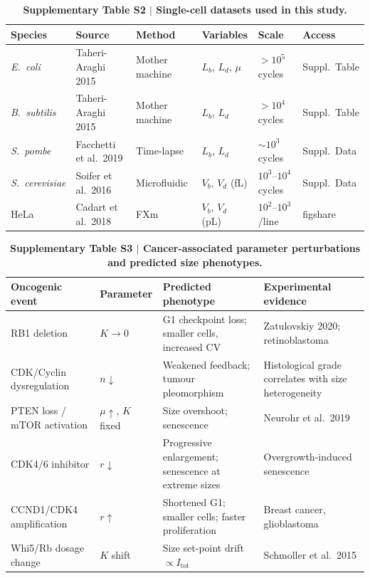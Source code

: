 \documentclass[11pt]{article}
\begin{document}
\begin{table}[H]
\centering
\caption{\textbf{Supplementary Table S2 $|$ Single-cell datasets used
in this study.}}
\small
\begin{tabular}{llllll}
\toprule
\textbf{Species} & \textbf{Source} & \textbf{Method} & \textbf{Variables}
  & \textbf{Scale} & \textbf{Access} \\
\midrule
\textit{E.~coli}
  & Taheri-Araghi 2015
  & Mother machine
  & $L_b$, $L_d$, $\mu$
  & $>10^5$ cycles
  & Suppl.\ Table \\
\textit{B.~subtilis}
  & Taheri-Araghi 2015
  & Mother machine
  & $L_b$, $L_d$
  & $>10^4$ cycles
  & Suppl.\ Table \\
\textit{S.~pombe}
  & Facchetti et al.\ 2019
  & Time-lapse
  & $L_b$, $L_d$
  & $\sim10^3$ cycles
  & Suppl.\ Data \\
\textit{S.~cerevisiae}
  & Soifer et al.\ 2016
  & Microfluidic
  & $V_b$, $V_d$ (fL)
  & $10^3$--$10^4$ cycles
  & Suppl.\ Data \\
HeLa
  & Cadart et al.\ 2018
  & FXm
  & $V_b$, $V_d$ (pL)
  & $10^2$--$10^3$/line
  & figshare \\
\bottomrule
\end{tabular}
\end{table}

\begin{table}[H]
\centering
\caption{\textbf{Supplementary Table S3 $|$ Cancer-associated parameter
perturbations and predicted size phenotypes.}}
\small
\begin{tabular}{p{2.8cm}p{1.8cm}p{4.2cm}p{3.8cm}}
\toprule
\textbf{Oncogenic event} & \textbf{Parameter} & \textbf{Predicted phenotype}
  & \textbf{Experimental evidence} \\
\midrule
RB1 deletion & $K \to 0$ & G1 checkpoint loss; smaller cells,
  increased CV & Zatulovskiy 2020; retinoblastoma \\
\addlinespace
CDK/Cyclin dysregulation & $n \downarrow$ & Weakened feedback;
  tumour pleomorphism & Histological grade correlates with
  size heterogeneity \\
\addlinespace
PTEN loss / mTOR activation & $\mu \uparrow$, $K$ fixed & Size
  overshoot; senescence & Neurohr et al.\ 2019 \\
\addlinespace
CDK4/6 inhibitor & $r \downarrow$ & Progressive enlargement;
  senescence at extreme sizes & Overgrowth-induced senescence \\
\addlinespace
CCND1/CDK4 amplification & $r \uparrow$ & Shortened G1; smaller
  cells; faster proliferation & Breast cancer, glioblastoma \\
\addlinespace
Whi5/Rb dosage change & $K$ shift & Size set-point drift
  $\propto I_{\mathrm{tot}}$ & Schmoller et al.\ 2015 \\
\bottomrule
\end{tabular}
\end{table}
\end{document}
